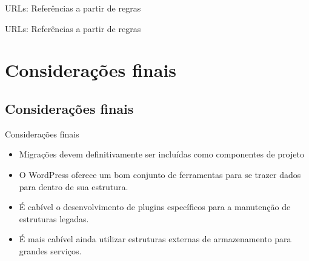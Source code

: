 \documentclass[handout]{beamer}
\begin{document}
\begin{frame}{URLs: Referências a partir de regras}
  
\end{frame}

\begin{frame}{URLs: Referências a partir de regras}
  
\end{frame}

\section{Considerações finais}
\subsection{Considerações finais}

\begin{frame}{Considerações finais}
  \begin{itemize}
    \pause \item Migrações devem definitivamente ser incluídas como componentes
      de projeto
    \pause \item O WordPress oferece um bom conjunto de ferramentas para se
      trazer dados para dentro de sua estrutura.
    \pause \item É cabível o desenvolvimento de plugins específicos para a
      manutenção de estruturas legadas.
    \item É mais cabível ainda utilizar estruturas externas de armazenamento
      para grandes serviços.
  \end{itemize}
\end{frame}
\end{document}
